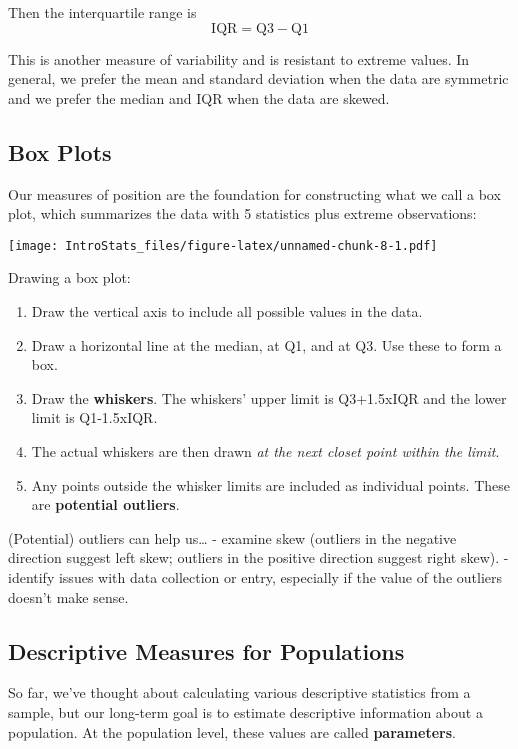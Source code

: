\documentclass[
]{book}
\providecommand{\tightlist}{%
  \setlength{\itemsep}{0pt}\setlength{\parskip}{0pt}}
\begin{document}
Then the interquartile range is
\[
  \text{IQR} = \text{Q3}-\text{Q1}
\]

This is another measure of variability and is resistant to extreme values. In general, we prefer the mean and standard deviation when the data are symmetric and we prefer the median and IQR when the data are skewed.

\hypertarget{box-plots}{%
\subsection{Box Plots}\label{box-plots}}

Our measures of position are the foundation for constructing what we call a box plot, which summarizes the data with 5 statistics plus extreme observations:

\texttt{[image: IntroStats\_files/figure-latex/unnamed-chunk-8-1.pdf]}

Drawing a box plot:

\begin{enumerate}
\def\labelenumi{\arabic{enumi}.}
\tightlist
\item
  Draw the vertical axis to include all possible values in the data.
\item
  Draw a horizontal line at the median, at Q1, and at Q3. Use these to form a box.
\item
  Draw the \textbf{whiskers}. The whiskers' upper limit is Q3+1.5xIQR and the lower limit is Q1-1.5xIQR.
\item
  The actual whiskers are then drawn \emph{at the next closet point within the limit}.
\item
  Any points outside the whisker limits are included as individual points. These are \textbf{potential outliers}.
\end{enumerate}

(Potential) outliers can help us\ldots{}
- examine skew (outliers in the negative direction suggest left skew; outliers in the positive direction suggest right skew).
- identify issues with data collection or entry, especially if the value of the outliers doesn't make sense.

\hypertarget{descriptive-measures-for-populations}{%
\subsection{Descriptive Measures for Populations}\label{descriptive-measures-for-populations}}

So far, we've thought about calculating various descriptive statistics from a sample, but our long-term goal is to estimate descriptive information about a population. At the population level, these values are called \textbf{parameters}.
\end{document}

